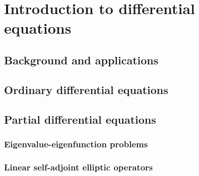 

\chapter{Introduction to differential equations}

\section{Background and applications}

\section{Ordinary differential equations}



\section{Partial differential equations}



\subsection{Eigenvalue-eigenfunction problems}

\subsection{Linear self-adjoint elliptic operators}

\begin{theorem}
\end{theorem}

\begin{theorem}
\end{theorem}

\begin{theorem}
\end{theorem}

\stopchapter
